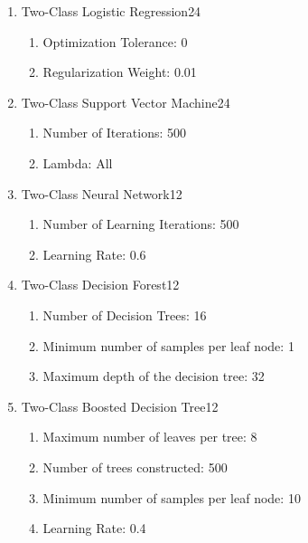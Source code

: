 \begin{enumerate}
    \item{Two-Class Logistic Regression}24
    
    \begin{enumerate}
        \item{Optimization Tolerance:} 0
        \item{Regularization Weight:} 0.01
    \end{enumerate}
    
    \item{Two-Class Support Vector Machine}24
    
    \begin{enumerate}
        \item{Number of Iterations:} 500
        \item{Lambda:} All
    \end{enumerate}
    
    \item{Two-Class Neural Network}12
    
    \begin{enumerate}
        \item{Number of Learning Iterations:} 500
        \item{Learning Rate:} 0.6
    \end{enumerate}
    
    \item{Two-Class Decision Forest}12

    \begin{enumerate}
        \item{Number of Decision Trees:} 16
        \item{Minimum number of samples per leaf node:} 1
        \item{Maximum depth of the decision tree:} 32
    \end{enumerate}
    
    \item{Two-Class Boosted Decision Tree}12
    
    \begin{enumerate}
        \item{Maximum number of leaves per tree:} 8
        \item{Number of trees constructed:} 500
        \item{Minimum number of samples per leaf node:} 10
        \item{Learning Rate:} 0.4
    \end{enumerate}
    
\end{enumerate}


